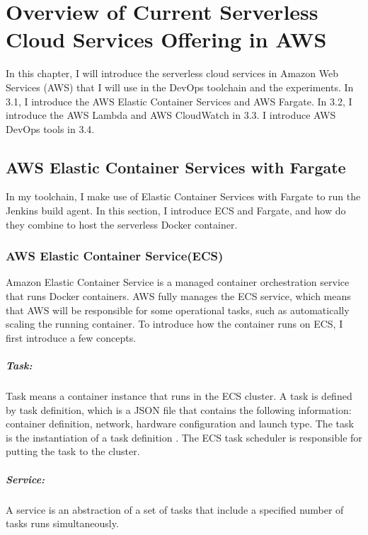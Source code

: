 \chapter{Overview of Current Serverless Cloud Services Offering in AWS}
In this chapter, I will introduce the serverless cloud services in Amazon Web Services (AWS) that I will use in the DevOps toolchain and the experiments.
 In 3.1, I introduce the AWS Elastic Container Services and AWS Fargate. In 3.2, I introduce the AWS Lambda and AWS CloudWatch in 3.3. I introduce AWS DevOps tools in 3.4.
\section{AWS Elastic Container Services with Fargate}
In my toolchain, I make use of Elastic Container Services with Fargate to run the Jenkins build agent. In this section, I introduce ECS and Fargate, and how do they combine to host the serverless Docker container.
\subsection{AWS Elastic Container Service(ECS)}
Amazon Elastic Container Service is a managed container orchestration service that runs Docker containers. AWS fully manages the ECS service, which means that AWS will be responsible for some operational tasks, such as automatically scaling the running container. To introduce how the container runs on ECS, I first introduce a few concepts.
\paragraph{Task:} Task means a container instance that runs in the ECS cluster. A task is defined by task definition, which is a JSON file that contains the following information: container definition, network, hardware configuration and launch type. The task is the instantiation of a task definition \cite{WhatisAm71:online}. The ECS task scheduler is responsible for putting the task to the cluster. 
\paragraph{Service:} A service is an abstraction of a set of tasks that include a specified number of tasks runs simultaneously.
